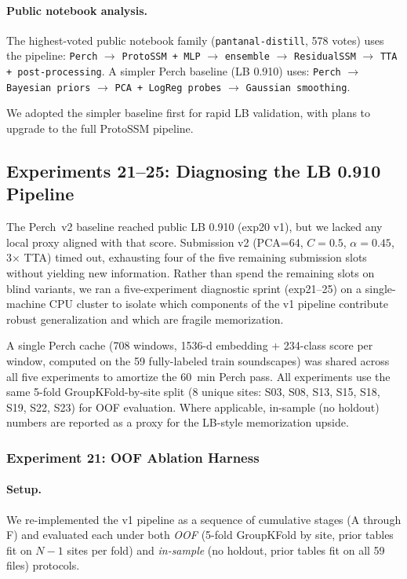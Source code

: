 \paragraph{Public notebook analysis.}
The highest-voted public notebook family (\texttt{pantanal-distill}, 578 votes)
uses the pipeline:
\texttt{Perch} $\rightarrow$ \texttt{ProtoSSM + MLP} $\rightarrow$ \texttt{ensemble}
$\rightarrow$ \texttt{ResidualSSM} $\rightarrow$ \texttt{TTA + post-processing}.
A simpler Perch baseline (LB 0.910) uses:
\texttt{Perch} $\rightarrow$ \texttt{Bayesian priors} $\rightarrow$
\texttt{PCA + LogReg probes} $\rightarrow$ \texttt{Gaussian smoothing}.

We adopted the simpler baseline first for rapid LB validation, with plans to
upgrade to the full ProtoSSM pipeline.

\subsection{Experiments 21--25: Diagnosing the LB 0.910 Pipeline}
\label{sec:exp21-25}

The Perch~v2 baseline reached public LB 0.910 (exp20 v1), but we lacked any
local proxy aligned with that score. Submission v2 (PCA=64, $C{=}0.5$,
$\alpha{=}0.45$, 3$\times$ TTA) timed out, exhausting four of the five
remaining submission slots without yielding new information. Rather than
spend the remaining slots on blind variants, we ran a five-experiment
diagnostic sprint (exp21--25) on a single-machine CPU cluster to isolate
which components of the v1 pipeline contribute robust generalization and
which are fragile memorization.

A single Perch cache (708 windows, 1536-d embedding + 234-class score per
window, computed on the 59 fully-labeled train soundscapes) was shared
across all five experiments to amortize the 60~min Perch pass.
All experiments use the same 5-fold GroupKFold-by-site split (8 unique
sites: S03, S08, S13, S15, S18, S19, S22, S23) for OOF evaluation. Where
applicable, in-sample (no holdout) numbers are reported as a proxy for the
LB-style memorization upside.

\subsubsection{Experiment 21: OOF Ablation Harness}
\label{sec:exp21}

\paragraph{Setup.}
We re-implemented the v1 pipeline as a sequence of cumulative stages
(A through F) and evaluated each under both \emph{OOF} (5-fold GroupKFold
by site, prior tables fit on $N{-}1$ sites per fold) and \emph{in-sample}
(no holdout, prior tables fit on all 59 files) protocols.

